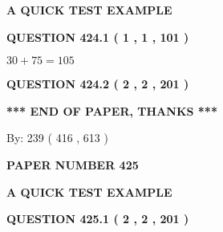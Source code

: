 \documentclass[12pt]{article}
\begin{document}
   
\vspace{0.2in}
   
   
   
   
   
   
 \vspace{0.2in}
{\LARGE {\textbf{ A QUICK TEST EXAMPLE}}}
   
   
  
\vspace{0.2in}
  
{\textbf{\Large{QUESTION
424.1 
 ( 1 , 1 , 101 )
}}}
  
  
 
 

$ %
30 +  %
75=   %
105$
 
 
  
\vspace{0.2in}
  
{\textbf{\Large{QUESTION
424.2 
 ( 2 , 2 , 201 )
}}}
  
  
   
   
 \vspace{0.2in}
 
   
   
   
   
\vspace{1.0in} 
{\textbf{\large{ *** END OF PAPER, THANKS *** }}} 
   
   
\hspace{1.0in} By: 
 239 ( 416 ,  613 )
   
   
   
   
\newpage 
\setcounter{page}{ 
   425001 } 
   
   
   
   
 {\textbf{ \Large{ PAPER NUMBER  425  }}}
   
   
\vspace{0.2in}
   
   
   
   
   
   
 \vspace{0.2in}
{\LARGE {\textbf{ A QUICK TEST EXAMPLE}}}
   
   
  
\vspace{0.2in}
  
{\textbf{\Large{QUESTION
425.1 
 ( 2 , 2 , 201 )
}}}
  
\end{document}
